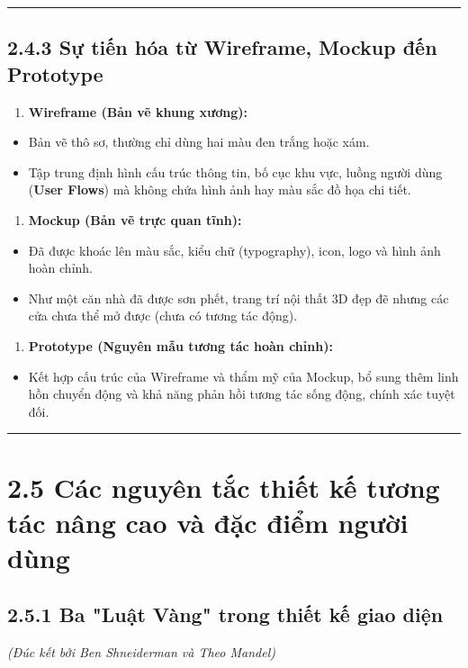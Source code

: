 \documentclass[11pt,a4paper,oneside]{report}
\begin{document}
\bigskip\hrule\bigskip

\subsection{2.4.3 Sự tiến hóa từ Wireframe, Mockup đến Prototype}
\begin{enumerate}[leftmargin=1.5em]
\item \textbf{Wireframe (Bản vẽ khung xương):}  
\end{enumerate}
\begin{itemize}[leftmargin=1.5em]
\item Bản vẽ thô sơ, thường chỉ dùng hai màu đen trắng hoặc xám.  
\item Tập trung định hình cấu trúc thông tin, bố cục khu vực, luồng người dùng (\textbf{User Flows}) mà không chứa hình ảnh hay màu sắc đồ họa chi tiết.
\end{itemize}
\begin{enumerate}[leftmargin=1.5em]
\item \textbf{Mockup (Bản vẽ trực quan tĩnh):}  
\end{enumerate}
\begin{itemize}[leftmargin=1.5em]
\item Đã được khoác lên màu sắc, kiểu chữ (typography), icon, logo và hình ảnh hoàn chỉnh.  
\item Như một căn nhà đã được sơn phết, trang trí nội thất 3D đẹp đẽ nhưng các cửa chưa thể mở được (chưa có tương tác động).
\end{itemize}
\begin{enumerate}[leftmargin=1.5em]
\item \textbf{Prototype (Nguyên mẫu tương tác hoàn chỉnh):}  
\end{enumerate}
\begin{itemize}[leftmargin=1.5em]
\item Kết hợp cấu trúc của Wireframe và thẩm mỹ của Mockup, bổ sung thêm linh hồn chuyển động và khả năng phản hồi tương tác sống động, chính xác tuyệt đối.
\end{itemize}

\bigskip\hrule\bigskip

\section{2.5 Các nguyên tắc thiết kế tương tác nâng cao và đặc điểm người dùng}

\subsection{2.5.1 Ba "Luật Vàng" trong thiết kế giao diện}
\textit{(Đúc kết bởi Ben Shneiderman và Theo Mandel)}
\end{document}
